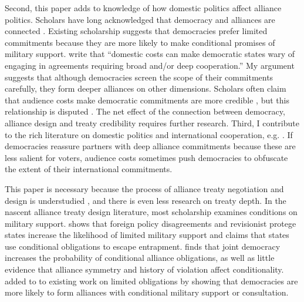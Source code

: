 \documentclass[12pt]{article}
\begin{document}
Second, this paper adds to knowledge of how domestic politics affect alliance politics. 
Scholars have long acknowledged that democracy and alliances are connected \citep{LaiReiter2000, GiblerWolford2006, Mattes2012, Warren2016, McManusYarhi-Milo2017}. 
Existing scholarship suggests that democracies prefer limited commitments \citep{Mattes2012, Chibaetal2015} because they are more likely to make conditional promises of military support. 
\citet{Chibaetal2015} write that ``domestic costs can make democratic states wary of engaging in agreements requiring broad and/or deep cooperation.'' 
My argument suggests that although democracies screen the scope of their commitments carefully, they form deeper alliances on other dimensions.  
Scholars often claim that audience costs make democratic commitments are more credible \citep{Gaubatz1996, Leedsetal2009, DigiuseppePoast2016}, but this relationship is disputed \citep{GartzkeGleditsch2004, DownesSechser2012}. 
The net effect of the connection between democracy, alliance design and treaty credibility requires further research. 
Third, I contribute to the rich literature on domestic politics and international cooperation, e.g. \citep{DownesRocke1995, Fearon1998, Leeds1999, MattesRodriguez2014}. 
If democracies reassure partners with deep alliance commitments because these are less salient for voters, audience costs sometimes push democracies to obfuscate the extent of their international commitments. 


This paper is necessary because the process of alliance treaty negotiation and design is understudied \citep{Poast2019a}, and there is even less research on treaty depth. 
In the nascent alliance treaty design literature, most scholarship examines conditions on military support.
\citet{Benson2012} shows that foreign policy disagreements and revisionist protege states increase the likelihood of limited military support and \citet{Kim2011} claims that states use conditional obligations to escape entrapment. 
\citet{Mattes2012} finds that joint democracy increases the probability of conditional alliance obligations, as well as little evidence that alliance symmetry and history of violation affect conditionality. 
\citet{Chibaetal2015} added to to existing work on limited obligations by showing that democracies are more likely to form alliances with conditional military support or consultation. 
\end{document}
